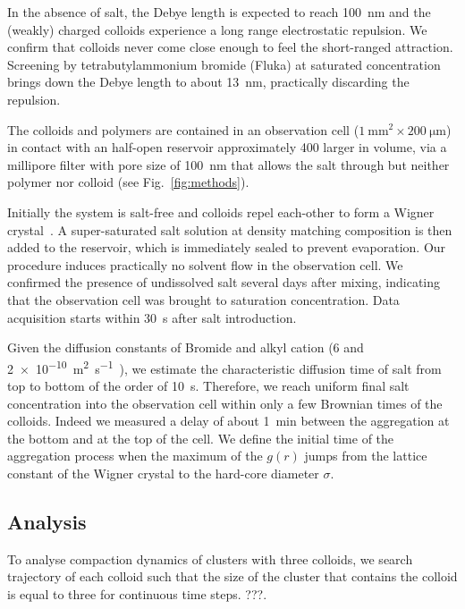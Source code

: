 In the absence of salt, the Debye length is expected to reach \SI{100}{\nano\metre} and the (weakly) charged colloids experience a long range electrostatic repulsion. We confirm that colloids never come close enough to feel the short-ranged attraction. Screening by tetrabutylammonium bromide (Fluka) at saturated concentration brings down the Debye length to about \SI{13}{\nano\metre}, practically discarding the repulsion.

The colloids and polymers are contained in an observation cell ($\SI{1}{\milli\metre^2} \times \SI{200}{\micro\metre}$) in contact with an half-open reservoir approximately 400 larger in volume, via a millipore filter with pore size of \SI{100}{\nano\metre} that allows the salt through but neither polymer nor colloid (see Fig.~\ref{fig:methods}).

Initially the system is salt-free and colloids repel each-other to form a Wigner crystal~\cite{Royall2003}. A super-saturated salt solution at density matching composition is then added to the reservoir, which is immediately sealed to prevent evaporation. Our procedure induces practically no solvent flow in the observation cell. We confirmed the presence of undissolved salt several days after mixing, indicating that the observation cell was brought to saturation concentration. Data acquisition starts within \SI{30}{\second} after salt introduction.

Given the diffusion constants of Bromide and alkyl cation ($6$ and \SI{2e-10}{\metre^2\second^{-1}}~\cite{Campbell2005}), we estimate the characteristic diffusion time of salt from top to bottom of the order of \SI{10}{\second}. Therefore, we reach uniform final salt concentration into the observation cell within only a few Brownian times of the colloids. Indeed we measured a delay of about \SI{1}{\minute} between the aggregation at the bottom and at the top of the cell. We define the initial time of the aggregation process when the maximum of the $g(r)$ jumps from the lattice constant of the Wigner crystal to the hard-core diameter $\sigma$.


\subsection*{Analysis}

To analyse compaction dynamics of clusters with three colloids, we search trajectory of each colloid such that the size of the cluster that contains the colloid is equal to three for continuous time steps.
???.

